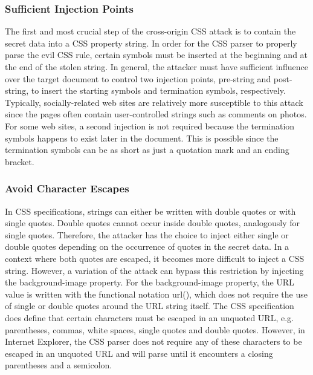 \documentclass{acm_proc_article-sp}
\begin{document}
{\subsubsection{Sufficient Injection Points}
The first and most crucial step of the cross-origin CSS attack is to contain the secret data into a CSS property string. In order for the CSS parser to properly parse the evil CSS rule, certain symbols must be inserted at the beginning and at the end of the stolen string. In general, the attacker must have sufficient influence over the target document to control two injection points, pre-string and post-string, to insert the starting symbols and termination symbols, respectively. Typically, socially-related web sites are relatively more susceptible to this attack since the pages often contain user-controlled strings such as comments on photos. For some web sites, a second injection is not required because the termination symbols happens to exist later in the document. This is possible since the termination symbols can be as short as just a quotation mark and an ending bracket. 

\subsubsection{Avoid Character Escapes}
In CSS specifications\cite{css}, strings can either be written with double quotes or with single quotes. Double quotes cannot occur inside double quotes, analogously for single quotes. Therefore, the attacker has the choice to inject either single or double quotes depending on the occurrence of quotes in the secret data. In a context where both quotes are escaped, it becomes more difficult to inject a CSS string. However, a variation of the attack  can bypass this restriction by injecting the background-image property. For the background-image property, the URL value is written with the functional notation url(), which does not require the use of single or double quotes around the URL string itself. The CSS specification does define that certain characters must be escaped in an unquoted URL, e.g. parentheses, commas, white spaces, single quotes and double quotes. However, in Internet Explorer, the CSS parser does not require any of these characters to be escaped in an unquoted URL and will parse until it encounters a closing parentheses and a semicolon.

}
\end{document}
